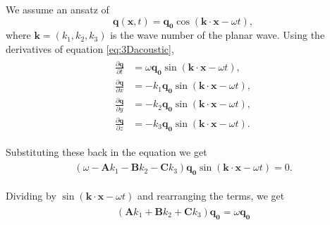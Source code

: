 We assume an ansatz of 
\begin{equation}
    \mathbf{q}\left(\mathbf{x}, t\right) = \mathbf{q_0} \cos\left(\mathbf{k}\cdot\mathbf{x} - \omega t\right),
\end{equation}
where $\mathbf{k}=\left(k_1, k_2, k_3\right)$ is the wave number of the planar wave. Using the derivatives of equation \ref{eq:3Dacoustic},
\begin{align}
    \begin{split}
    \frac{\partial \mathbf{q}}{\partial t} &= \omega \mathbf{q_0} \sin\left(\mathbf{k}\cdot\mathbf{x} - \omega t\right), \\
    \frac{\partial \mathbf{q}}{\partial x} &= -k_1 \mathbf{q_0} \sin\left(\mathbf{k}\cdot\mathbf{x} - \omega t\right), \\
    \frac{\partial \mathbf{q}}{\partial y} &= -k_2 \mathbf{q_0} \sin\left(\mathbf{k}\cdot\mathbf{x} - \omega t\right), \\
    \frac{\partial \mathbf{q}}{\partial z} &= -k_3 \mathbf{q_0} \sin\left(\mathbf{k}\cdot\mathbf{x} - \omega t\right).
\end{split}
\end{align}

Substituting these back in the equation we get
\begin{align}
    \begin{split}
        \left(\omega - \mathbf{A}k_1 - \mathbf{B}k_2 - \mathbf{C}k_3\right)\mathbf{q_0}\sin\left(\mathbf{k}\cdot\mathbf{x} - \omega t\right) = 0.
    \end{split}
\end{align}

Dividing by $\sin\left(\mathbf{k}\cdot\mathbf{x} - \omega t\right)$ and rearranging the terms, we get
\begin{align}
    \begin{split}
        \left(\mathbf{A}k_1 + \mathbf{B}k_2 + \mathbf{C}k_3\right)\mathbf{q_0} = \omega \mathbf{q_0}
    \end{split}
\end{align}

